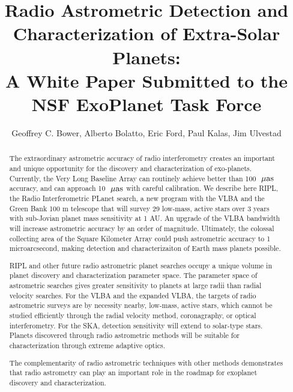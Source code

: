 \documentclass[12pt,preprint]{aastex}
\begin{document}
\def\gsim{\;\rlap{\lower 2.5pt
\hbox{$\sim$}}\raise 1.5pt\hbox{$>$}\;}
\def\lsim{\;\rlap{\lower 2.5pt
   \hbox{$\sim$}}\raise 1.5pt\hbox{$<$}\;}
\def\msun{{\rm\,M_\odot}}
\newcommand\degd{\ifmmode^{\circ}\!\!\!.\,\else$^{\circ}\!\!\!.\,$\fi}
\newcommand{\etal}{{\it et al.\ }}
\newcommand{\uv}{(u,v)}
\newcommand{\rdm}{{\rm\ rad\ m^{-2}}}
\newcommand{\muas}{{\rm\ \mu as}}
\def\earth{{\oplus}}
\def\ripl{RIPL\, }

\title{Radio Astrometric Detection and Characterization of Extra-Solar Planets:
\\
A White Paper Submitted to the NSF ExoPlanet Task Force}

\author{Geoffrey C. Bower, Alberto Bolatto, Eric Ford, Paul Kalas, Jim
Ulvestad}


\begin{abstract}

The extraordinary astrometric accuracy of radio interferometry 
creates an important and unique opportunity for the discovery and 
characterization of exo-planets.  Currently, the Very Long Baseline Array
can routinely achieve better than 100 $\muas$ accuracy, and
can approach 10 $\muas$ with careful calibration.  
We describe here RIPL, the Radio Interferometric PLanet
search, a new program with the VLBA and the Green Bank 100 m telescope
that will survey 29 low-mass,
active stars over 3 years with sub-Jovian planet mass sensitivity at 1 AU.
An upgrade of the VLBA bandwidth will increase astrometric accuracy
by an order of magnitude.  Ultimately, the colossal collecting area of the 
Square Kilometer Array could push astrometric accuracy to 1 microarcsecond,
making detection and characterizaiton of Earth mass planets possible.

RIPL and other future radio astrometric planet searches occupy a unique
volume in planet discovery and characterization parameter space.
The parameter space of astrometric searches gives greater sensitivity
to planets at large radii than radial velocity searches.
For the VLBA and the expanded VLBA,
the targets of radio astrometric surveys are by necessity nearby, low-mass,
active stars, which cannot be studied efficiently through
the radial velocity method, coronagraphy, or optical interferometry.  
For the SKA, detection sensitivity will extend to solar-type stars.
Planets discovered
through radio astrometric methods will be suitable for characterization
through extreme adaptive optics.

The complementarity of radio astrometric techniques with other 
methods demonstrates that radio astrometry can play an important role 
in the roadmap for exoplanet discovery and characterization.  

\end{abstract}
\end{document}

